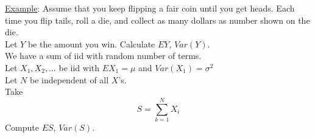    \noindent\underline{Example}: Assume that you keep flipping a fair coin until you get
      heads. Each time you flip tails, roll a die, and collect as many dollars as number
      shown on the die.\\
      Let $Y$ be the amount you win. Calculate $EY$, $Var(Y)$.\\
      We have a sum of iid with random number of terms.\\
      Let $X_1, X_2, \ldots$ be iid with $EX_1 = \mu$ and $Var(X_1) = \sigma^2$\\
      Let $N$ be independent of all $X$'s.\\
      Take 
      $$
        S = \sum_{k = 1}^N X_i
      $$
      Compute $ES$, $Var(S)$.
